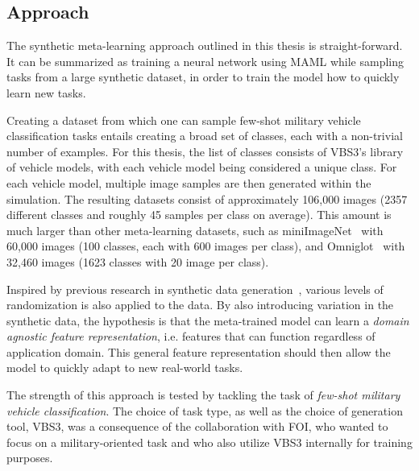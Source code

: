 \subsection{Approach}
The synthetic meta-learning approach outlined in this thesis is straight-forward. It can be summarized as training a neural network using \gls{MAML} while sampling tasks from a large synthetic dataset, in order to train the model how to quickly learn new tasks. 

Creating a dataset from which one can sample few-shot military vehicle classification tasks entails creating a broad set of classes, each with a non-trivial number of examples. For this thesis, the list of classes consists of \gls{VBS3}'s library of vehicle models, with each vehicle model being considered a unique class. For each vehicle model, multiple image samples are then generated within the simulation. The resulting datasets consist of approximately 106,000 images (2357 different classes and roughly 45 samples per class on average). This amount is much larger than other meta-learning datasets, such as miniImageNet~\cite{matching} with 60,000 images (100 classes, each with 600 images per class), and Omniglot~\cite{omniglot} with 32,460 images (1623 classes with 20 image per class).


Inspired by previous research in synthetic data generation~\cite{goodsynthetic, domainrand, domainrandcars, structureddomainrandomization}, various levels of randomization is also applied to the data. By also introducing variation in the synthetic data, the hypothesis is that the meta-trained model can learn a \textit{domain agnostic feature representation}, i.e. features that can function regardless of application domain. This general feature representation should then allow the model to quickly adapt to new real-world tasks. 

The strength of this approach is tested by tackling the task of \textit{few-shot military vehicle classification}. The choice of task type, as well as the choice of generation tool, \gls{VBS3}, was a consequence of the collaboration with \gls{FOI}, who wanted to focus on a military-oriented task and who also utilize \gls{VBS3} internally for training purposes.





